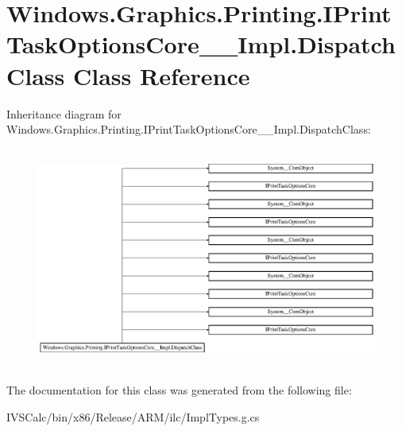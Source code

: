 \hypertarget{class_windows_1_1_graphics_1_1_printing_1_1_i_print_task_options_core_____impl_1_1_dispatch_class}{}\section{Windows.\+Graphics.\+Printing.\+I\+Print\+Task\+Options\+Core\+\_\+\+\_\+\+Impl.\+Dispatch\+Class Class Reference}
\label{class_windows_1_1_graphics_1_1_printing_1_1_i_print_task_options_core_____impl_1_1_dispatch_class}
Inheritance diagram for Windows.\+Graphics.\+Printing.\+I\+Print\+Task\+Options\+Core\+\_\+\+\_\+\+Impl.\+Dispatch\+Class\+:\begin{figure}[H]
\begin{center}
\leavevmode
\includegraphics[height=7.298578cm]{class_windows_1_1_graphics_1_1_printing_1_1_i_print_task_options_core_____impl_1_1_dispatch_class}
\end{center}
\end{figure}


The documentation for this class was generated from the following file\+:\begin{DoxyCompactItemize}
\item 
I\+V\+S\+Calc/bin/x86/\+Release/\+A\+R\+M/ilc/Impl\+Types.\+g.\+cs\end{DoxyCompactItemize}
